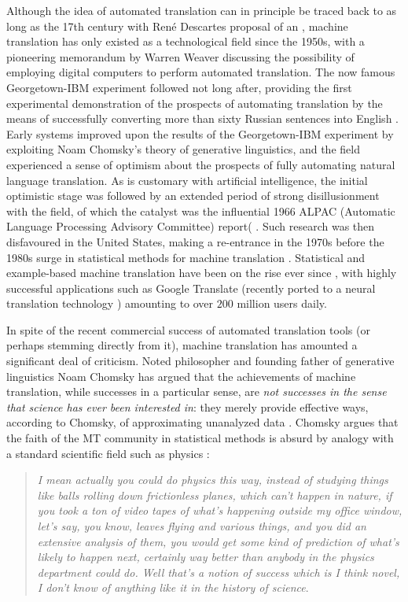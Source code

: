 \documentclass[fleqn,10pt]{article}
\begin{document}
Although the idea of automated translation can in principle be traced back to as long as the 17th century with Ren\'{e} Descartes proposal of an  \cite{dascal1982universal}, machine translation has only existed as a technological field since the 1950s, with a pioneering memorandum by  Warren Weaver \cite{locke1955machine,weaver1955translation} discussing the possibility of employing digital computers to perform automated translation. The now famous Georgetown-IBM experiment followed not long after, providing the first experimental demonstration of the prospects of automating translation by the means of successfully converting more than sixty Russian sentences into English \cite{gordin2015scientific}. Early systems improved upon the results of the Georgetown-IBM experiment by exploiting Noam Chomsky's theory of generative linguistics, and the field experienced a sense of optimism about the prospects of fully automating natural language translation. As is customary with artificial intelligence, the initial optimistic stage was followed by an extended period of strong disillusionment with the field, of which the catalyst was the influential 1966 ALPAC (Automatic Language Processing Advisory Committee) report( \cite{hutchins1986machine}. 
Such research was then disfavoured in the United States, making a re-entrance in the 1970s before the 1980s surge in statistical methods for machine translation \cite{koehn2009statistical,Moses2007}. Statistical and example-based machine translation have been on the rise ever since \cite{Bahdanau2014,carl2003recent,Firat2017}, with highly successful applications such as Google Translate (recently ported to a neural translation technology \cite{wu2016google}) amounting to over $200$ million users daily.

In spite of the recent commercial success of automated translation tools (or perhaps stemming directly from it), machine translation has amounted a significant deal of criticism. Noted philosopher and founding father of generative linguistics Noam Chomsky has argued that the achievements of machine translation, while successes in a particular sense, are \emph{not successes in the sense that science has ever been interested in}: they merely provide effective ways, according to Chomsky, of approximating unanalyzed data \cite{Chomsky2011,norvig2017chomsky}. Chomsky argues that the faith of the MT community in statistical methods is absurd by analogy with a standard scientific field such as physics \cite{Chomsky2011}:

\begin{quotation}
\textsl{I mean actually you could do physics this way, instead of studying things like balls rolling down frictionless planes, which can't happen in nature, if you took a ton of video tapes of what's happening outside my office window, let's say, you know, leaves flying and various things, and you did an extensive analysis of them, you would get some kind of prediction of what's likely to happen next, certainly way better than anybody in the physics department could do. Well that's a notion of success which is I think novel, I don't know of anything like it in the history of science}.
\end{quotation}
\end{document}
